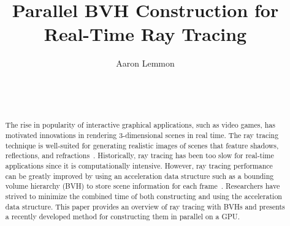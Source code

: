 \documentclass{sig-alternate}
\begin{document}

\title{Parallel BVH Construction for Real-Time Ray Tracing}


\author{
\alignauthor
Aaron Lemmon\\
	\\
	\\
	\\
}

\maketitle
\begin{abstract}

The rise in popularity of interactive graphical applications, such as video games, has motivated innovations in rendering 3-dimensional scenes in real time. The ray tracing technique is well-suited for generating realistic images of scenes that feature shadows, reflections, and refractions~\cite{Whitted:1980}. Historically, ray tracing has been too slow for real-time applications since it is computationally intensive. However, ray tracing performance can be greatly improved by using an acceleration data structure such as a bounding volume hierarchy (BVH) to store scene information for each frame~\cite{Garanzha:2011}. Researchers have strived to minimize the combined time of both constructing and using the acceleration data structure. This paper provides an overview of ray tracing with BVHs and presents a recently developed method for constructing them in parallel on a GPU.
	
\end{abstract}
\end{document}
